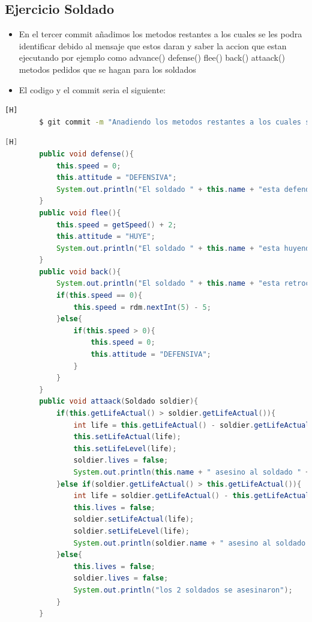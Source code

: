 \documentclass{article}
\begin{document}
	\subsection{Ejercicio Soldado}
	\begin{itemize}	
		\item En el tercer commit añadimos los metodos restantes a los cuales se les podra identificar debido al mensaje que estos daran y saber la accion que estan ejecutando por ejemplo como advance() defense() flee() back() attaack() metodos pedidos que se hagan para los soldados
		\item El codigo y el commit seria el siguiente:
	\end{itemize}	
	\begin{lstlisting}[language=bash,caption={Commit}][H]
		$ git commit -m "Anadiendo los metodos restantes a los cuales se les podra identificar debido al mensaje que estos daran y saber la accion que estan ejecutando por ejemplo como advance() defense() flee() back() attaack() metodos pedidos que se hagan para los soldados"
	\end{lstlisting}	
	\begin{lstlisting}[language=java,caption={Las lineas de codigos del metodo creado:}][H]
		public void defense(){
			this.speed = 0;
			this.attitude = "DEFENSIVA";
			System.out.println("El soldado " + this.name + "esta defendiendo");
		}
		public void flee(){
			this.speed = getSpeed() + 2;
			this.attitude = "HUYE";
			System.out.println("El soldado " + this.name + "esta huyendo");
		}
		public void back(){
			System.out.println("El soldado " + this.name + "esta retrocediendo");
			if(this.speed == 0){
				this.speed = rdm.nextInt(5) - 5;
			}else{
				if(this.speed > 0){
					this.speed = 0;
					this.attitude = "DEFENSIVA";
				}
			}
		}
		public void attaack(Soldado soldier){
			if(this.getLifeActual() > soldier.getLifeActual()){
				int life = this.getLifeActual() - soldier.getLifeActual();
				this.setLifeActual(life);
				this.setLifeLevel(life);
				soldier.lives = false;
				System.out.println(this.name + " asesino al soldado " + soldier.name);
			}else if(soldier.getLifeActual() > this.getLifeActual()){
				int life = soldier.getLifeActual() - this.getLifeActual();
				this.lives = false;
				soldier.setLifeActual(life);
				soldier.setLifeLevel(life);
				System.out.println(soldier.name + " asesino al soldado " + this.name);
			}else{
				this.lives = false;
				soldier.lives = false;
				System.out.println("los 2 soldados se asesinaron");
			}
		}

	\end{lstlisting}
\end{document}
